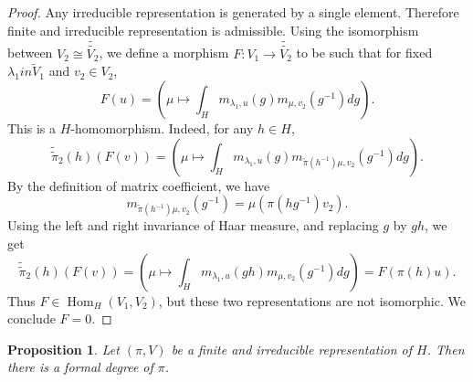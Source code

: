 \documentclass[8pt]{article}
\newtheorem{proposition}{Proposition}[section]
\DeclareMathOperator{\Hom}{Hom}
\begin{document}
\begin{proof}
  Any irreducible representation is generated by a single element. Therefore finite and irreducible representation is admissible. 
  Using the isomorphism between $V_2\cong\widetilde{\widetilde{V_2}}$, we define a morphism $F:V_1\to\widetilde{\widetilde{V_2}}$ to be such that for fixed $\lambda_1in\widetilde{V}_1$ and $v_2\in V_2$,
  \begin{equation*}
    F(u) = (\mu\mapsto\int_Hm_{\lambda_1,u}(g)m_{\mu,v_2}(g^{-1})dg). 
  \end{equation*}
  This is a $H$-homomorphism. Indeed, for any $h\in H$,
  \begin{equation*}
    \widetilde{\widetilde{\pi}}_2(h)(F(v)) = (\mu\mapsto\int_Hm_{\lambda_1,u}(g)m_{\widetilde{\pi}(h^{-1})\mu,v_2}(g^{-1})dg). 
  \end{equation*}
  By the definition of matrix coefficient, we have 
  \begin{equation*}
  m_{\widetilde{\pi}(h^{-1})\mu,v_2}(g^{-1}) = \mu(\pi(hg^{-1})v_2).
  \end{equation*}
Using the left and right invariance of Haar measure, and replacing $g$ by $gh$, we get 
\begin{equation*}
    \widetilde{\widetilde{\pi}}_2(h)(F(v)) = (\mu\mapsto\int_Hm_{\lambda_1,u}(gh)m_{\mu,v_2}(g^{-1})dg) = F(\pi(h)u). 
  \end{equation*}
  Thus $F\in\Hom_H(V_1,V_2)$, but these two representations are not isomorphic. We conclude $F=0$.
\end{proof}

\begin{proposition}
  Let $(\pi,V)$ be a finite and irreducible representation of $H$. Then there is a formal degree of $\pi$. 
\end{proposition}
\end{document}
